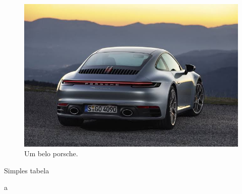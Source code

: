 \documentclass{article}
\begin{document}
\begin{figure}
	\includegraphics[width=\linewidth]{porsche.jpeg}
	\caption{Um belo porsche.}
	\label{fig:porsche_911}
\end{figure}

\begin{table}
  \caption{Simples tabela}
\end{table}

a
\newpage

\begin{appendix}
	\listoffigures
	\listoftables
\end{appendix}
\end{document}
